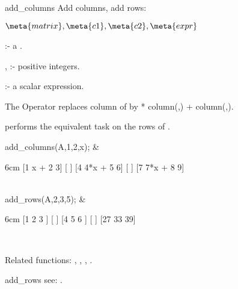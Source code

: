 \begin{Operator}{add_columns}
Add columns, add rows:
\begin{Syntax}
\(\meta{matrix},\meta{c1},\meta{c2},\meta{expr}\)
\end{Syntax}

 :- a . 

, :- positive integers. 

 :- a scalar expression. 

The Operator  replaces column  of 
  by  * column(,) +
column(,).

 performs the equivalent task on the rows of 
.

\begin{Examples}

add_columns(A,1,2,x); &
\begin{multilineoutput}{6cm}
[1   x + 2   3]
[             ]
[4  4*x + 5  6]
[             ]
[7  7*x + 8  9]
\end{multilineoutput} \\

add_rows(A,2,3,5); & 
\begin{multilineoutput}{6cm}
[1   2   3 ]
[          ]
[4   5   6 ]
[          ]
[27  33  39]
\end{multilineoutput} \\

\end{Examples}

Related functions: , 
, , 
.

\end{Operator}


\begin{Operator}{add_rows}
 see: .
\end{Operator}


